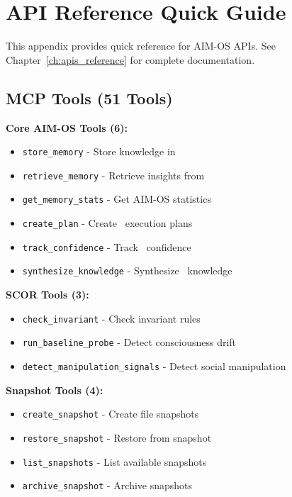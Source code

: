 
\chapter{API Reference Quick Guide}

This appendix provides quick reference for AIM-OS APIs. See Chapter~\ref{ch:apis_reference} for complete documentation.

\section*{MCP Tools (51 Tools)}

\textbf{Core AIM-OS Tools (6):}
\begin{itemize}
    \item \texttt{store\_memory} - Store knowledge in \cmc
    \item \texttt{retrieve\_memory} - Retrieve insights from \hhni
    \item \texttt{get\_memory\_stats} - Get AIM-OS statistics
    \item \texttt{create\_plan} - Create \apoe\ execution plans
    \item \texttt{track\_confidence} - Track \vif\ confidence
    \item \texttt{synthesize\_knowledge} - Synthesize \seg\ knowledge
\end{itemize}

\textbf{SCOR Tools (3):}
\begin{itemize}
    \item \texttt{check\_invariant} - Check invariant rules
    \item \texttt{run\_baseline\_probe} - Detect consciousness drift
    \item \texttt{detect\_manipulation\_signals} - Detect social manipulation
\end{itemize}

\textbf{Snapshot Tools (4):}
\begin{itemize}
    \item \texttt{create\_snapshot} - Create file snapshots
    \item \texttt{restore\_snapshot} - Restore from snapshot
    \item \texttt{list\_snapshots} - List available snapshots
    \item \texttt{archive\_snapshot} - Archive snapshots
\end{itemize}

